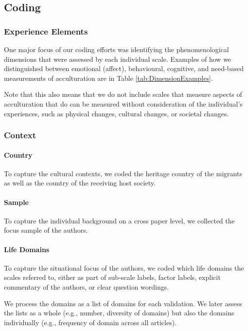 \documentclass[man, 12pt, a4paper]{apa7}
\begin{document}
\subsection{Coding}
\subsubsection{Experience Elements}
One major focus of our coding efforts was identifying the phenomenological dimensions that were assessed by each individual scale. Examples of how we distinguished between emotional (affect), behavioural, cognitive, and need-based measurements of acculturation are in Table \ref{tab:DimensionExamples}.


Note that this also means that we do not include scales that measure aspects of acculturation that do can be measured without consideration of the individual’s experiences, such as physical changes, cultural changes, or societal changes.

\subsubsection{Context}

\paragraph{Country}
To capture the cultural contexts, we coded the heritage country of the migrants as well as the country of the receiving host society.

\paragraph{Sample}
To capture the individual background on a cross paper level, we collected the focus sample of the authors.

\paragraph{Life Domains}
To capture the situational focus of the authors, we coded which life domains the scales referred to, either as part of sub-scale labels, factor labels, explicit commentary of the authors, or clear question wordings. 

We process the domains as a list of domains for each validation. We later assess the lists as a whole (e.g., number, diversity of domains) but also the domains individually (e.g., frequency of domain across all articles).
\end{document}
